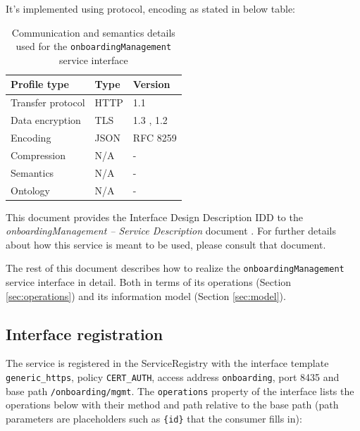 \documentclass[a4paper]{arrowhead}
\begin{document}
It's implemented using protocol, encoding as stated in below table:
\begin{table}[ht!]
  \centering
  \begin{tabular}{|l|l|l|}
    \hline
    \rowcolor{gray!33} Profile type & Type & Version \\ \hline
    Transfer protocol & HTTP & 1.1 \cite{rfc9112} \\ \hline
    Data encryption & TLS & 1.3 \cite{rfc8446}, 1.2 \cite{rfc5246} \\ \hline
    Encoding & JSON & RFC 8259 \cite{rfc8259} \\ \hline
    Compression & N/A & - \\ \hline
    Semantics & N/A & - \\ \hline
    Ontology & N/A & - \\ \hline
  \end{tabular}
  \caption{Communication and semantics details used for the \texttt{onboarding\allowbreak{}Management} service interface}
  \label{tab:comunication_semantics_profile}
\end{table}

This document provides the Interface Design Description IDD to the \textit{onboardingManagement -- Service Description} document \cite{onb-onboardingManagement-sd}.
For further details about how this service is meant to be used, please consult that document.

The rest of this document describes how to realize the \texttt{onboarding\allowbreak{}Management} service
interface in detail. Both in terms of its operations (Section \ref{sec:operations}) and its information model (Section \ref{sec:model}).

\subsection{Interface registration}

The service is registered in the ServiceRegistry with the interface template \texttt{generic\_\allowbreak{}https}, policy \texttt{CERT\_\allowbreak{}AUTH}, access address \texttt{onboarding}, port 8435 and base path \texttt{/\allowbreak{}onboarding/\allowbreak{}mgmt}. The \texttt{operations} property of the interface lists the operations below with their method and path relative to the base path (path parameters are placeholders such as \texttt{\{id\}} that the consumer fills in):
\end{document}
